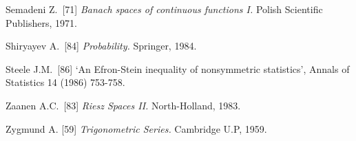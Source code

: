 {Semadeni Z.\ [71] {\it Banach spaces of continuous functions I.}
Polish Scientific Publishers, 1971.  \cmmnt{[\S253 {\it notes}.]}

Shiryayev A.\ [84] {\it Probability.} Springer, 1984. \cmmnt{[285N.]}

Steele J.M.\ [86] `An Efron-Stein inequality of nonsymmetric statistics',
Annals of Statistics 14 (1986) 753-758.
\cmmnt{[274Ya.]}

\medskip%

Zaanen A.C.\ [83] {\it Riesz Spaces II.} North-Holland, 1983.
\cmmnt{[241F.]}

Zygmund A. [59] {\it Trigonometric Series.}   Cambridge U.P, 1959.

\frnewpage

}%
